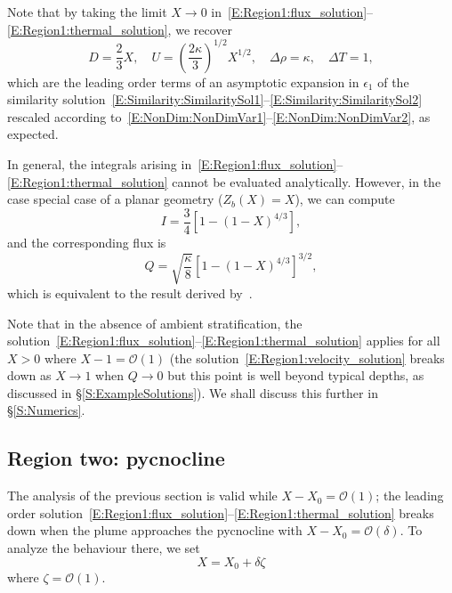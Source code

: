 \documentclass[openacc]{rsproca_new}%
\newcommand{\order}[1]{\mathcal{O}(#1)}
\newcommand{\epsone}{\epsilon_{1}} %
\newcommand{\lt}{\delta} %
\begin{document}
Note that by taking the limit $X \to 0$ in~\eqref{E:Region1:flux_solution}--\eqref{E:Region1:thermal_solution}, we recover 
\begin{equation}\label{E:Region1:dimensionless_similarity}
D = \frac{2}{3}X, \quad U = \left(\frac{2\kappa}{3}\right)^{1/2}X^{1/2}, \quad \Delta \rho = \kappa, \quad \Delta T = 1,
\end{equation} 
which are the leading order terms of an asymptotic expansion in $\epsone$ of the similarity solution~\eqref{E:Similarity:SimilaritySol1}--\eqref{E:Similarity:SimilaritySol2} rescaled according to~\eqref{E:NonDim:NonDimVar1}--\eqref{E:NonDim:NonDimVar2}, as expected.

In general, the integrals arising in~\eqref{E:Region1:flux_solution}--\eqref{E:Region1:thermal_solution} cannot be evaluated analytically. However, in the case special case of a planar geometry ($Z_b(X) = X$), we can compute
\begin{equation}
    I = \frac{3}{4}\left[1 - (1 - X)^{4/3}\right],
\end{equation}
and the corresponding flux is
\begin{equation}\label{E:Region1:Lazeroms_flux}
Q =  \sqrt{\frac{\kappa}{8}}\left[1 - (1-X)^{4/3}\right]^{3/2},
\end{equation}
which is equivalent to the result derived by~\cite{Lazeroms2019JPhysOcean}.

Note that in the absence of ambient stratification, the solution~\eqref{E:Region1:flux_solution}--\eqref{E:Region1:thermal_solution} applies for all $X> 0$ where $X - 1 = \mathcal{O}(1)$ (the solution~\eqref{E:Region1:velocity_solution} breaks down as $X \to 1$ when $Q \to 0$ but this point is well beyond typical depths, as discussed in \S\ref{S:ExampleSolutions}). We shall discuss this further in \S\ref{S:Numerics}.

\subsection{Region two: pycnocline}\label{S:Asymptotics:Region2}
The analysis of the previous section is valid while $X - X_0 = \mathcal{O}(1)$; the leading order solution~\eqref{E:Region1:flux_solution}--\eqref{E:Region1:thermal_solution} breaks down when the plume approaches the pycnocline with $X - X_0 = \order{\delta}$. To analyze the behaviour there, we set
\begin{equation}\label{E:pycnocline:length_scaling}
X = X_0 + \lt \zeta
\end{equation}
where $\zeta = \mathcal{O}(1)$. 
\end{document}
